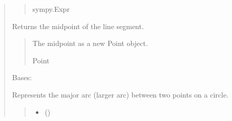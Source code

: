 \documentclass[letterpaper,10pt,english]{sphinxmanual}
\begin{document}
\begin{quote}
\begin{fulllineitems}
\begin{fulllineitems}
\begin{quote}
\begin{description}
\sphinxAtStartPar
sympy.Expr

\end{description}\end{quote}

\end{fulllineitems}


\begin{fulllineitems}
\label{\detokenize{pygeox:pygeox.basic_objects.LineSegment.midpoint}}
\pysigstartsignatures
\pysigline
{}
\pysigstopsignatures
\sphinxAtStartPar
Returns the midpoint of the line segment.
\begin{quote}\begin{description}
\sphinxAtStartPar
The midpoint as a new Point object.

\sphinxAtStartPar
Point

\end{description}\end{quote}

\end{fulllineitems}


\end{fulllineitems}


\begin{fulllineitems}
\label{\detokenize{pygeox:pygeox.basic_objects.MajorArc}}
\pysigstartsignatures
\pysiglinewithargsret
{}
{\sphinxparamcomma {}\sphinxparamcomma {}\sphinxparamcomma {}}
{}
\pysigstopsignatures
\sphinxAtStartPar
Bases: 

\sphinxAtStartPar
Represents the major arc (larger arc) between two points on a circle.
\begin{quote}\begin{description}
\begin{itemize}
\item {} 
\sphinxAtStartPar
{} ()


\end{itemize}
\end{description}
\end{quote}
\end{fulllineitems}
\end{quote}
\end{document}
